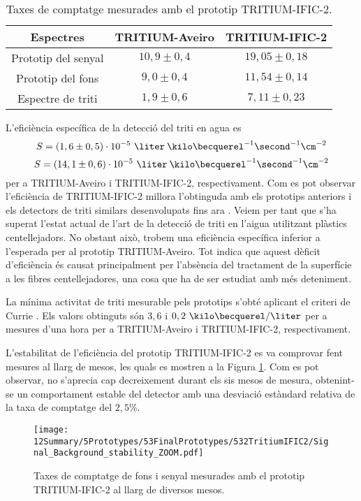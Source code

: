 \begin{table}[htbp]
\centering{}%
\begin{tabular}{ccc}
\toprule 
Espectres & TRITIUM-Aveiro & TRITIUM-IFIC-2  \tabularnewline
\midrule
\midrule 
Prototip del senyal & $10,9 \pm 0,4$ & $19,05 \pm 0,18$ \tabularnewline
Prototip del fons & $9,0 \pm 0,4$ & $11,54 \pm 0,14$ \tabularnewline  
Espectre de triti & $1,9 \pm 0,6$ & $7,11 \pm 0,23$ \tabularnewline
\bottomrule
\end{tabular}
\caption{Taxes de comptatge mesurades amb el prototip TRITIUM-IFIC-2.}
\label{tab:ContesPerSegonTRITIUMIFIC2}
\end{table}

L'eficiència específica de la detecció del triti en agua es
$$S = (1,6 \pm 0,5)\cdot{} 10^{-5}~\liter\:\kilo\becquerel^{-1}\second^{-1}\cm^{-2}$$
$$S = (14,1 \pm 0,6)\cdot{} 10^{-5}~\liter\:\kilo\becquerel^{-1}\second^{-1}\cm^{-2}$$
per a TRITIUM-Aveiro i TRITIUM-IFIC-2, respectivament. Com es pot observar l'eficiència de TRITIUM-IFIC-2 millora l'obtinguda amb els prototips anteriors i els detectors de triti similars desenvolupats fins ara \cite{Hofstetter1, Hofstetter2}. Veiem per tant que s'ha superat l'estat actual de l'art de la detecció de triti en l'aigua utilitzant plàstics centellejadors. No obstant això, trobem una eficiència específica inferior a l'esperada per al prototip TRITIUM-Aveiro. Tot indica que aquest dèficit d'eficiència és causat principalment per l'absència del tractament de la superfície a les fibres centellejadores, una cosa que ha de ser estudiat amb més deteniment.

La mínima activitat de triti mesurable pels prototips s'obté aplicant el criteri de Currie \cite{Knoll}. Els valors obtinguts són $3,6$ i $0,2~\kilo\becquerel/\liter$ per a mesures d'una hora per a TRITIUM-Aveiro i TRITIUM-IFIC-2, respectivament. 

L'estabilitat de l'eficiència del prototip TRITIUM-IFIC-2 es va comprovar fent mesures al llarg de mesos, les quals es mostren a la Figura \ref{fig:MonitoritzacioTRITIUMIFIC2}. Com es pot observar, no s'aprecia cap decreixement durant els sis mesos de mesura, obtenint-se un comportament estable del detector amb una desviació estàndard relativa de la taxa de comptatge del $2,5\%$.

\begin{figure}[h]
\centering
\texttt{[image: 12Summary/5Prototypes/53FinalPrototypes/532TritiumIFIC2/Signal\_Background\_stability\_ZOOM.pdf]}
\caption{Taxes de comptatge de fons i senyal mesurades amb el prototip TRITIUM-IFIC-2 al llarg de diversos mesos.\label{fig:MonitoritzacioTRITIUMIFIC2}}
\end{figure}

